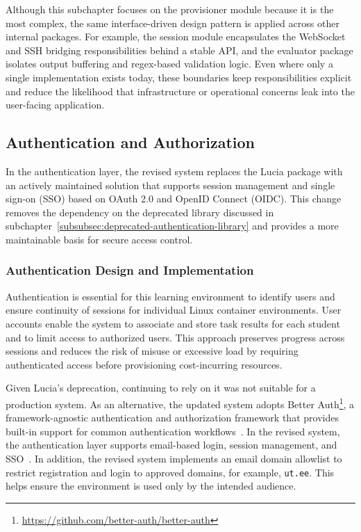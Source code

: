 Although this subchapter focuses on the provisioner module because it is the most complex, the same interface-driven design pattern is applied across other internal packages.
For example, the session module encapsulates the WebSocket and SSH bridging responsibilities behind a stable API, and the evaluator package isolates output buffering and regex-based validation logic.
Even where only a single implementation exists today, these boundaries keep responsibilities explicit and reduce the likelihood that infrastructure or operational concerns leak into the user-facing application.

\subsection{Authentication and Authorization} \label{subsec:authentication-and-authorization}
In the authentication layer, the revised system replaces the Lucia package with an actively maintained solution that supports session management and single sign-on (SSO) based on OAuth 2.0 and OpenID Connect (OIDC).
This change removes the dependency on the deprecated library discussed in subchapter~\ref{subsubsec:deprecated-authentication-library} and provides a more maintainable basis for secure access control.

\subsubsection{Authentication Design and Implementation} \label{subsubsec:authentication-design-and-implementation}
Authentication is essential for this learning environment to identify users and ensure continuity of sessions for individual Linux container environments.
User accounts enable the system to associate and store task results for each student and to limit access to authorized users.
This approach preserves progress across sessions and reduces the risk of misuse or excessive load by requiring authenticated access before provisioning cost-incurring resources.

Given Lucia's deprecation, continuing to rely on it was not suitable for a production system.
As an alternative, the updated system adopts Better Auth\footnote{\url{https://github.com/better-auth/better-auth}}, a framework-agnostic authentication and authorization framework that provides built-in support for common authentication workflows~\cite{better_auth_introduction}.
In the revised system, the authentication layer supports email-based login, session management, and SSO~\cite{better_auth_introduction}.
In addition, the revised system implements an email domain allowlist to restrict registration and login to approved domains, for example, \texttt{ut.ee}.
This helps ensure the environment is used only by the intended audience.

